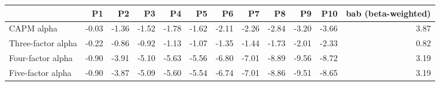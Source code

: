 \begin{tabular}{lrrrrrrrrrrr}
\toprule
{} &    P1 &    P2 &    P3 &    P4 &    P5 &    P6 &    P7 &    P8 &    P9 &   P10 &  bab (beta-weighted) \\
\midrule
CAPM alpha         & -0.03 & -1.36 & -1.52 & -1.78 & -1.62 & -2.11 & -2.26 & -2.84 & -3.20 & -3.66 &                 3.87 \\
Three-factor alpha & -0.22 & -0.86 & -0.92 & -1.13 & -1.07 & -1.35 & -1.44 & -1.73 & -2.01 & -2.33 &                 0.82 \\
Four-factor alpha  & -0.90 & -3.91 & -5.10 & -5.63 & -5.56 & -6.80 & -7.01 & -8.89 & -9.56 & -8.72 &                 3.19 \\
Five-factor alpha  & -0.90 & -3.87 & -5.09 & -5.60 & -5.54 & -6.74 & -7.01 & -8.86 & -9.51 & -8.65 &                 3.19 \\
\bottomrule
\end{tabular}
